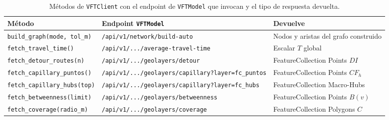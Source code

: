 \begin{table}[htbp]
    \centering
    \footnotesize
    \caption[Métodos de \texttt{VFTClient} e indicadores asociados]{Métodos
    de \texttt{VFTClient} con el endpoint de \texttt{VFTModel} que
    invocan y el tipo de respuesta devuelta.}
    \label{tab:tg-vftclient-metodos}
    \begin{tabularx}{\textwidth}{|l|>{\raggedright\arraybackslash}X|>{\raggedright\arraybackslash}p{3.6cm}|}
        \hline
        \textbf{Método} & \textbf{Endpoint \texttt{VFTModel}} & \textbf{Devuelve} \\
        \hline
        \texttt{build\_graph(mode, tol\_m)}  & \nolinkurl{/api/v1/network/build-auto}                    & Nodos y aristas del grafo construido \\
        \texttt{fetch\_travel\_time()}        & \nolinkurl{/api/v1/.../average-travel-time}               & Escalar $T$ global \\
        \texttt{fetch\_detour\_routes(n)}    & \nolinkurl{/api/v1/.../geolayers/detour}                  & FeatureCollection Points $DI$ \\
        \texttt{fetch\_capillary\_puntos()}   & \nolinkurl{/api/v1/.../geolayers/capillary?layer=fc_puntos} & FeatureCollection Points $CF_h$ \\
        \texttt{fetch\_capillary\_hubs(top)} & \nolinkurl{/api/v1/.../geolayers/capillary?layer=fc_hubs}   & FeatureCollection Macro-Hubs \\
        \texttt{fetch\_betweenness(limit)}   & \nolinkurl{/api/v1/.../geolayers/betweenness}             & FeatureCollection Points $B(v)$ \\
        \texttt{fetch\_coverage(radio\_m)}   & \nolinkurl{/api/v1/.../geolayers/coverage}                & FeatureCollection Polygons $C$ \\
        \hline
    \end{tabularx}
\end{table}




